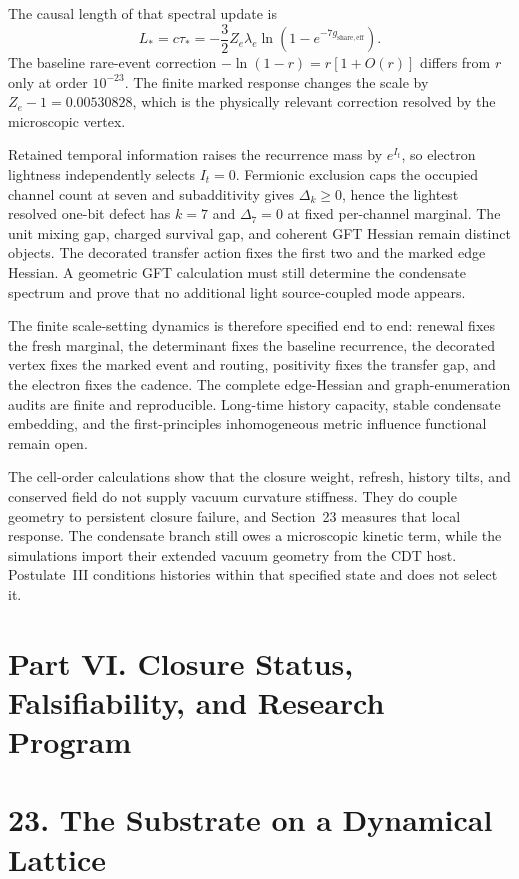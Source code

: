 \documentclass[11pt]{article}
\begin{document}
The causal length of that spectral update is
\[
\boxed{
L_*=c\tau_*=-\frac32Z_e\lambda_e\ln\!\left(1-e^{-7g_{\mathrm{share,eff}}}\right)
}.
\]
The baseline rare-event correction $-\ln(1-r)=r[1+O(r)]$ differs from $r$ only at order $10^{-23}$. The finite marked response changes the scale by $Z_e-1=0.00530828$, which is the physically relevant correction resolved by the microscopic vertex.

Retained temporal information raises the recurrence mass by $e^{I_t}$, so electron lightness independently selects $I_t=0$. Fermionic exclusion caps the occupied channel count at seven and subadditivity gives $\Delta_k\ge0$, hence the lightest resolved one-bit defect has $k=7$ and $\Delta_7=0$ at fixed per-channel marginal. The unit mixing gap, charged survival gap, and coherent GFT Hessian remain distinct objects. The decorated transfer action fixes the first two and the marked edge Hessian. A geometric GFT calculation must still determine the condensate spectrum and prove that no additional light source-coupled mode appears.

The finite scale-setting dynamics is therefore specified end to end: renewal fixes the fresh marginal, the determinant fixes the baseline recurrence, the decorated vertex fixes the marked event and routing, positivity fixes the transfer gap, and the electron fixes the cadence. The complete edge-Hessian and graph-enumeration audits are finite and reproducible. Long-time history capacity, stable condensate embedding, and the first-principles inhomogeneous metric influence functional remain open.

The cell-order calculations show that the closure weight, refresh, history tilts, and conserved field do not supply vacuum curvature stiffness. They do couple geometry to persistent closure failure, and Section~23 measures that local response. The condensate branch still owes a microscopic kinetic term, while the simulations import their extended vacuum geometry from the CDT host. Postulate~III conditions histories within that specified state and does not select it.
\section*{Part VI. Closure Status, Falsifiability, and Research Program}

\section{23. The Substrate on a Dynamical Lattice}
\end{document}
